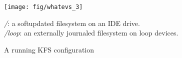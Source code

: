 \begin{figure}[htb]
  \centering
  \texttt{[image: fig/whatevs\_3]}
  \caption{A running KFS configuration}{{\it/}: a softupdated
    filesystem on an IDE drive.\\{\it/loop}: an externally journaled
    filesystem on loop devices.}
  \label{fig:kfs-graph}
\end{figure}
